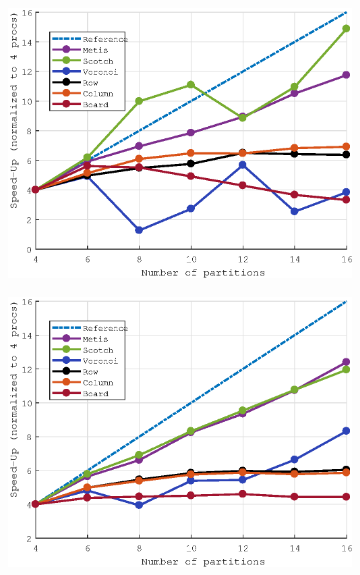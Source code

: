 \documentclass[a4paper,11pt]{article}
\begin{document}
\begin{figure}[H]\ContinuedFloat
	\begin{subfigure}[t]{0.45\textwidth}
		\centering
		\includegraphics[width=\textwidth]{robin_300x300_5_speedup.eps}
	\end{subfigure}
	\hfill
	\begin{subfigure}[t]{0.45\textwidth}
		\centering
		\includegraphics[width=\textwidth]{dirichlet_300x300_5_speedup.eps}
	\end{subfigure}
\end{figure}
\vspace*{-14mm}
\end{document}
